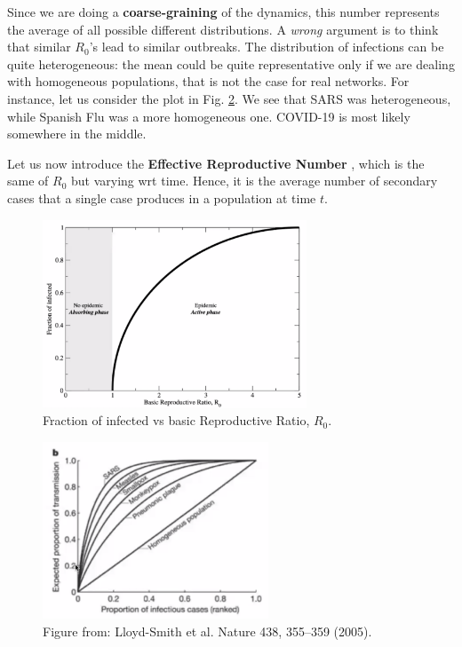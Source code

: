 \documentclass[../main/main.tex]{subfiles}
\begin{document}
Since we are doing a \textbf{coarse-graining} of the dynamics, this number represents the average of all possible different distributions. A \textit{wrong} argument is to think that similar $R_0$'s lead to similar outbreaks. The distribution of infections can be quite heterogeneous: the mean could be quite representative only if we are dealing with homogeneous populations, that is not the case for real networks. For instance, let us consider the plot in Fig. \ref{fig:3_outbreaks}. We see that SARS was heterogeneous, while Spanish Flu was a more homogeneous one. COVID-19 is most likely somewhere in the middle.

Let us now introduce the \textbf{Effective Reproductive Number} , which is the same of $R_0$ but varying wrt time. Hence, it is the average number of secondary cases that a single case produces in a population at time $t$.

\begin{figure}[h!]
\centering
\includegraphics[width=0.7\textwidth]{../lessons/image/02/2_R_0.png}
\caption{\label{fig:2_R_0.png} Fraction of infected vs basic Reproductive Ratio, \( R_0 \).}
\end{figure}

\begin{figure}[h!]
\centering
\includegraphics[width=0.6\textwidth]{../lessons/image/02/3_outbreaks.png}
\caption{\label{fig:3_outbreaks} Figure from: Lloyd-Smith et al. Nature 438, 355–359 (2005).}
\end{figure}
\end{document}
